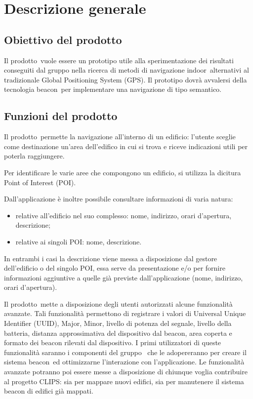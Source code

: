 \documentclass[../AnalisiDeiRequisiti.tex]{subfiles}
\begin{document}
\section{Descrizione generale}
	\subsection{Obiettivo del prodotto}
	Il prodotto\g\ vuole essere un prototipo utile alla sperimentazione dei risultati conseguiti dal gruppo nella ricerca di metodi di navigazione indoor\g\ alternativi al tradizionale Global Positioning System (GPS).
Il prototipo dovrà avvalersi della tecnologia beacon\g\ per implementare una navigazione di tipo semantico.

	\subsection{Funzioni del prodotto}
	Il prodotto\g\ permette la navigazione all’interno di un edificio: l’utente sceglie come destinazione un'area dell’edifico in cui si trova e riceve indicazioni utili per poterla raggiungere. 
	
	Per identificare le varie aree che compongono un edificio, si utilizza la dicitura Point of Interest (POI\g).
	
	Dall'applicazione è inoltre possibile consultare informazioni di varia natura:
	\begin{itemize}
		\item relative all’edificio nel suo complesso: nome, indirizzo, orari d'apertura, descrizione;
		\item relative ai singoli POI\g: nome, descrizione.
	\end{itemize}
	In entrambi i casi la descrizione viene messa a disposizione dal gestore dell'edificio o del singolo POI\g, essa serve da presentazione e/o per fornire informazioni aggiuntive a quelle già previste dall'applicazione (nome, indirizzo, orari d'apertura). 
	
	Il prodotto\g\ mette a disposizione degli utenti autorizzati alcune funzionalità avanzate. Tali funzionalità permettono di registrare  i valori di Universal Unique Identifier (UUID), Major, Minor, livello di potenza del segnale, livello della batteria, distanza approssimativa del dispositivo dal beacon\g, area coperta e formato dei beacon rilevati dal dispositivo. I primi utilizzatori di queste funzionalità saranno i componenti del gruppo \leaf\ che le adopereranno per creare il sistema beacon\g\ ed ottimizzarne l'interazione con l'applicazione. Le funzionalità avanzate potranno poi essere messe a disposizione di chiunque voglia contribuire al progetto CLIPS: sia per mappare nuovi edifici, sia per manutenere il sistema beacon di edifici già mappati.
		
\end{document}
